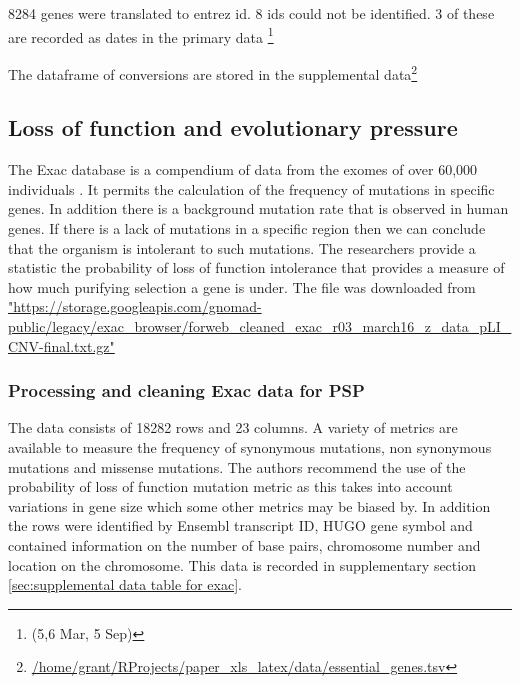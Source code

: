 8284 genes were translated to entrez id. 8 ids could not be identified. 3 of these are recorded as dates in the primary data \footnote{(5,6 Mar, 5 Sep)}
 
 The dataframe of conversions are stored in the supplemental data\footnote{ \url{/home/grant/RProjects/paper_xls_latex/data/essential_genes.tsv}}
\subsection{Loss of function and evolutionary pressure}

The Exac database is a compendium of data from the exomes of over 60,000 individuals \cite{lek2016analysis}. It permits the calculation of the frequency of mutations in specific genes. In addition there is a background mutation rate that is observed in human genes. If there is a lack of mutations in a specific region then we can conclude that the organism is intolerant to such mutations. The researchers provide a statistic the probability of loss of function intolerance that provides a measure of how much purifying selection a gene is under. The file was downloaded from 
\url{"https://storage.googleapis.com/gnomad-public/legacy/exac_browser/forweb_cleaned_exac_r03_march16_z_data_pLI_CNV-final.txt.gz"}

\subsubsection{Processing and cleaning Exac data for PSP}
The data consists of 18282 rows and 23 columns. A variety of metrics are available to measure the frequency of synonymous mutations, non synonymous mutations and missense mutations. The authors recommend the use of the probability of loss of function mutation metric as this takes into account variations in gene size which some other metrics may be biased by. In addition the rows were identified by Ensembl transcript ID, HUGO gene symbol and contained information on the number of base pairs, chromosome number and location on the chromosome. This data is recorded in supplementary section~
\ref{sec:supplemental data table for exac}.



